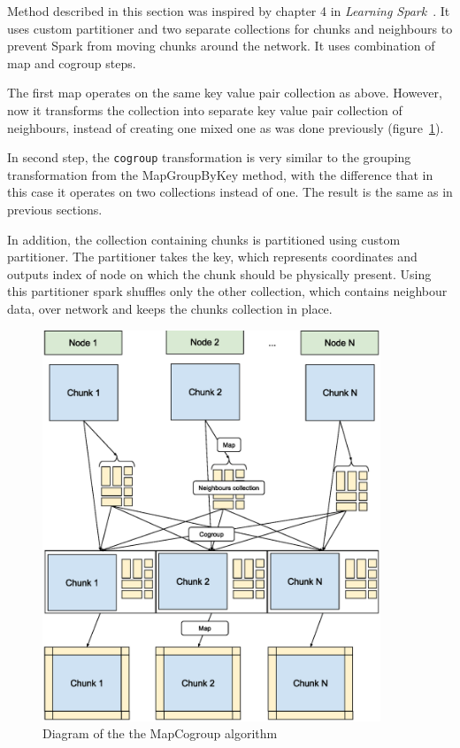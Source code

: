 \documentclass{l4proj}
\begin{document}
Method described in this section was inspired by chapter 4 in \textit{Learning Spark}~\cite{learning_spark}.
It uses custom partitioner and two separate collections for chunks and neighbours
to prevent Spark from moving chunks around the network. It uses combination
of map and cogroup steps.

The first map operates on the same key value pair collection as above. However,
now it transforms the collection into separate key value pair collection of neighbours,
instead of creating one mixed one as was done previously (figure~\ref{fig:map_cogroup}).

In second step, the \texttt{cogroup} transformation is very similar to the grouping transformation
from the MapGroupByKey method, with the difference that in this case it operates on two collections 
instead of one. The result is the same as in previous sections.

In addition, the collection containing chunks is partitioned using custom partitioner.
The partitioner takes the key, which represents coordinates and outputs index of node
on which the chunk should be physically present. Using this partitioner spark
shuffles only the other collection, which contains neighbour data, over network and
keeps the chunks collection in place.

\begin{figure}
\centering
\includegraphics[width=0.9\textwidth]{images/MapCogroup.eps}
\caption{Diagram of the the MapCogroup algorithm}
\label{fig:map_cogroup}
\end{figure}
\end{document}
